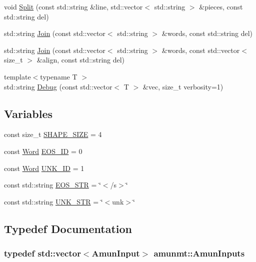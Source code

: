\begin{DoxyCompactItemize}
void \hyperlink{namespaceamunmt_a10b7486d36b130609c77e8356218c0a7}{Split} (const std\+::string \&line, std\+::vector$<$ std\+::string $>$ \&pieces, const std\+::string del)
\item 
std\+::string \hyperlink{namespaceamunmt_a24dbaa0ef7dc1f1fcaa131a0f0eacb43}{Join} (const std\+::vector$<$ std\+::string $>$ \&words, const std\+::string del)
\item 
std\+::string \hyperlink{namespaceamunmt_ab250df7f6ac3d2ec5365cceea1056aff}{Join} (const std\+::vector$<$ std\+::string $>$ \&words, const std\+::vector$<$ size\+\_\+t $>$ \&align, const std\+::string del)
\item 
{\footnotesize template$<$typename T $>$ }\\std\+::string \hyperlink{namespaceamunmt_a7dbfb9dca5a82c17500ab26efe71623e}{Debug} (const std\+::vector$<$ T $>$ \&vec, size\+\_\+t verbosity=1)
\end{DoxyCompactItemize}
\subsection*{Variables}
\begin{DoxyCompactItemize}
\item 
const size\+\_\+t \hyperlink{namespaceamunmt_a0c4d3d7c0b1b52dbe7a658b3dc026409}{S\+H\+A\+P\+E\+\_\+\+S\+I\+ZE} = 4
\item 
const \hyperlink{namespaceamunmt_a07c85682e789f72cc2fbbc3caf7d3800}{Word} \hyperlink{namespaceamunmt_a89f3b34944649f2108f2b8935e5f46dd}{E\+O\+S\+\_\+\+ID} = 0
\item 
const \hyperlink{namespaceamunmt_a07c85682e789f72cc2fbbc3caf7d3800}{Word} \hyperlink{namespaceamunmt_a7904fd3bd044d608e81e54933a771ec9}{U\+N\+K\+\_\+\+ID} = 1
\item 
const std\+::string \hyperlink{namespaceamunmt_a396941d367e0babddc9fa87260a805f7}{E\+O\+S\+\_\+\+S\+TR} = \char`\"{}$<$/s$>$\char`\"{}
\item 
const std\+::string \hyperlink{namespaceamunmt_aff26c2cbd5a97e90ecdc5e0dbba13516}{U\+N\+K\+\_\+\+S\+TR} = \char`\"{}$<$unk$>$\char`\"{}
\end{DoxyCompactItemize}


\subsection{Typedef Documentation}
\subsubsection[{\texorpdfstring{Amun\+Inputs}{AmunInputs}}]{\setlength{\rightskip}{0pt plus 5cm}typedef std\+::vector$<${\bf Amun\+Input}$>$ {\bf amunmt\+::\+Amun\+Inputs}}\hypertarget{namespaceamunmt_a5a9307eef76c887cbe1a67e780437eae}{}\label{namespaceamunmt_a5a9307eef76c887cbe1a67e780437eae}


